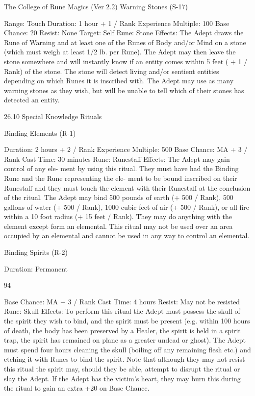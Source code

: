 \begin{Chapter}{The College of Rune Magics (Ver 2.2)}
Warning Stones (S-17) 

Range: Touch 
Duration: 1 hour + 1 / Rank 
Experience Multiple: 100 
Base Chance: 20%
Resist: None 
Target: Self 
Rune: Stone 
Effects: The Adept draws the Rune of Warning and 
at least one of the Runes of Body and/or Mind on a 
stone (which must weigh at least 1/2 lb. per Rune). 
The  Adept  may  then  leave  the  stone  somewhere 
and will instantly know if an entity comes within 5 
feet ( + 1 / Rank) of the stone. The stone will detect 
living  and/or  sentient  entities  depending  on  which 
Runes  it  is  inscribed  with.  The  Adept  may  use  as 
many  warning  stones  as  they  wish,  but  will  be 
unable to tell which of their stones has detected an 
entity. 

26.10 Special Knowledge Rituals 

Binding Elements (R-1) 

Duration: 2 hours + 2 / Rank 
Experience Multiple: 500 
Base Chance: MA + 3 / Rank 
Cast Time: 30 minutes 
Rune: Runestaff 
Effects:  The  Adept  may  gain  control  of  any  ele-
ment  by  using  this  ritual.  They  must  have  had  the 
Binding  Rune  and  the  Rune  representing  the  ele-
ment to be bound inscribed on their Runestaff and 
they must touch the element with their Runestaff at 
the  conclusion  of  the  ritual.  The  Adept  may  bind 
500 pounds of earth (+ 500 / Rank), 500 gallons of 
water (+ 500 / Rank), 1000 cubic feet of air (+ 500 
/ Rank), or all fire within a 10 foot radius (+ 15 feet 
/  Rank).  They  may  do  anything  with  the  element 
except  form  an  elemental.  This  ritual  may  not  be 
used  over  an  area  occupied  by  an  elemental  and 
cannot be used in any way to control an elemental. 

Binding Spirits (R-2) 

Duration: Permanent 

94 

Base Chance: MA + 3 / Rank 
Cast Time: 4 hours 
Resist: May not be resisted 
Rune: Skull 
Effects:  To  perform  this  ritual  the  Adept  must 
possess the skull of the spirit they wish to bind, and 
the spirit must be present (e.g. within 100 hours of 
death, the body has been preserved by a Healer, the 
spirit is held in a spirit trap, the spirit has remained 
on plane as a greater undead or ghost). The Adept 
must  spend  four  hours  cleaning  the  skull  (boiling 
off  any  remaining  flesh  etc.)  and  etching  it  with 
Runes  to  bind  the  spirit.  Note  that  although  they 
may not resist this ritual the spirit may, should they 
be  able,  attempt  to  disrupt  the  ritual  or  slay  the 
Adept.  If  the  Adept  has  the  victim’s  heart,  they 
may burn this during the ritual to gain an extra +20 
on Base Chance. 


\end{Chapter}
